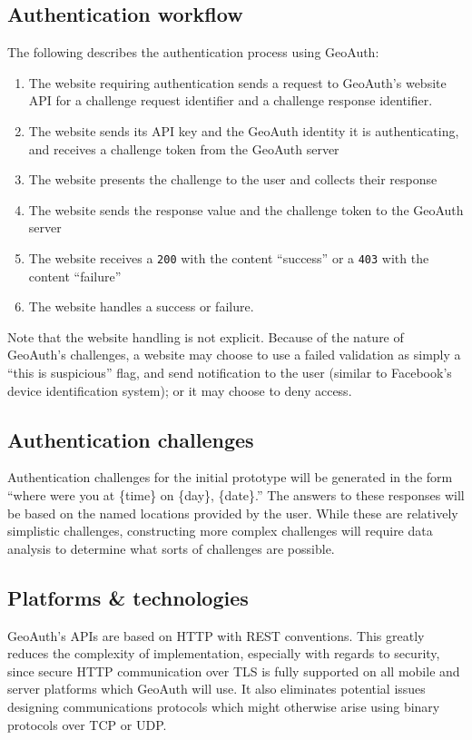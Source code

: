 \documentclass[11pt]{article} %
\begin{document}
\subsection{Authentication workflow}
The following describes the authentication process using GeoAuth:

\begin{enumerate}
\item The website requiring authentication sends a request to GeoAuth's website API for a challenge request identifier and a challenge response identifier.
\item The website sends its API key and the GeoAuth identity it is authenticating, and receives a challenge token from the GeoAuth server
\item The website presents the challenge to the user and collects their response
\item The website sends the response value and the challenge token to the GeoAuth server
\item The website receives a \texttt{200} with the content ``success'' or a \texttt{403} with the content ``failure''
\item The website handles a success or failure.
\end{enumerate}

Note that the website handling is not explicit. Because of the nature of GeoAuth's challenges, a website may choose to use a failed validation as simply a ``this is suspicious'' flag, and send notification to the user (similar to Facebook's device identification system); or it may choose to deny access.

\subsection{Authentication challenges}
Authentication challenges for the initial prototype will be generated in the form ``where were you at \{time\} on \{day\}, \{date\}.'' The answers to these responses will be based on the named locations provided by the user. While these are relatively simplistic challenges, constructing more complex challenges will require data analysis to determine what sorts of challenges are possible.

\subsection{Platforms \& technologies}
GeoAuth's APIs are based on HTTP with REST conventions. This greatly reduces the complexity of implementation, especially with regards to security, since secure HTTP communication over TLS is fully supported on all mobile and server platforms which GeoAuth will use. It also eliminates potential issues designing communications protocols which might otherwise arise using binary protocols over TCP or UDP.
\end{document}
